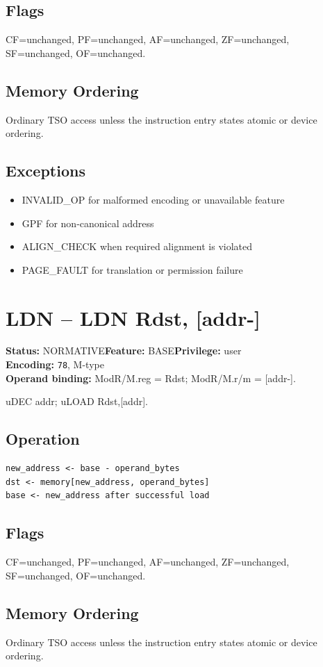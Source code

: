 \documentclass[10pt]{article}
\begin{document}
\subsection*{Flags}
CF=unchanged, PF=unchanged, AF=unchanged, ZF=unchanged, SF=unchanged, OF=unchanged.
\subsection*{Memory Ordering}
Ordinary TSO access unless the instruction entry states atomic or device ordering.
\subsection*{Exceptions}
\begin{itemize}
\item INVALID\_OP for malformed encoding or unavailable feature
\item GPF for non-canonical address
\item ALIGN\_CHECK when required alignment is violated
\item PAGE\_FAULT for translation or permission failure
\end{itemize}
\clearpage

\section{LDN -- LDN Rdst, [addr-]}
\textbf{Status:} NORMATIVE\quad \textbf{Feature:} BASE\quad \textbf{Privilege:} user\\
\textbf{Encoding:} \texttt{78}, M-type\\
\textbf{Operand binding:} ModR/M.reg = Rdst; ModR/M.r/m = [addr-].

uDEC addr; uLOAD Rdst,[addr].

\subsection*{Operation}
\begin{lstlisting}
new_address <- base - operand_bytes
dst <- memory[new_address, operand_bytes]
base <- new_address after successful load
\end{lstlisting}
\subsection*{Flags}
CF=unchanged, PF=unchanged, AF=unchanged, ZF=unchanged, SF=unchanged, OF=unchanged.
\subsection*{Memory Ordering}
Ordinary TSO access unless the instruction entry states atomic or device ordering.
\end{document}
